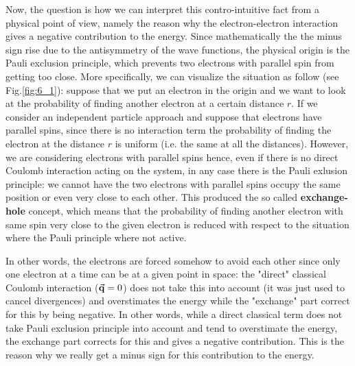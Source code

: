 \documentclass[../main/main.tex]{subfiles}
\begin{document}
Now, the question is how  we can interpret this contro-intuitive fact from a physical point of view, namely the reason why the electron-electron interaction gives a negative contribution to the energy.
Since mathematically the the minus sign rise due to the antisymmetry of the wave functions, the physical origin is the Pauli exclusion principle, which prevents two electrons with parallel spin from getting too close.
More specifically, we can visualize the situation as follow (see Fig.\ref{fig:6_1}):  suppose that we put an electron in the origin and we want to look at the probability of finding another electron at a certain distance \( r \). If we consider an independent particle approach and suppose that electrons have parallel spins, since there is no interaction term the probability of finding the electron at the distance \( r \) is uniform (i.e. the same at all the distances). However, we are considering electrons with parallel spins hence, even if there is no direct Coulomb interaction acting on the system, in any case there is the Pauli exlusion principle: we cannot have the two electrons with parallel spins occupy the same position or even very close to each other. This produced the so called \textbf{exchange-hole} concept, which means that the probability of finding another electron with same spin very close to the given electron is reduced with respect to the situation where the Pauli principle where not active.

In other words, the electrons are forced somehow to avoid each other since only one electron at a time can be at a given point in space: the "direct" classical Coulomb interaction (\( \va{q}=0 \)) does not take this into account (it was just used to cancel divergences) and overstimates the energy while the "exchange" part correct for this by being negative.
In other words, while a direct classical term does not take Pauli exclusion principle into account and tend to overstimate the energy, the exchange part corrects for this and gives a negative contribution.
This is the reason why we really get a minus sign for this contribution to the energy.
\end{document}

